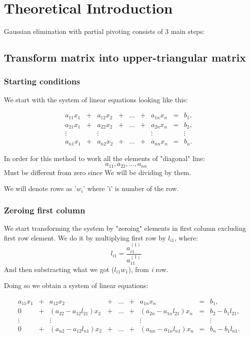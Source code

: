 \section{Theoretical Introduction}
Gaussian elimination with partial pivoting consists of 3 main steps:
\subsection{Transform matrix into upper-triangular matrix}

\subsubsection{Starting conditions}
We start with the system of linear equations looking like this:

\[
\begin{matrix}

&a_{11}x_1 &{}+&a_{12}x_2&+&\dots&+&a_{1n}x_n &=&b_1,\\

&a_{21}x_1 &{}+&a_{22}x_2&+&\dots&+&a_{2n}x_n &=&b_2,\\

&\vdots    &&\vdots      & &     & &  \vdots  & &\vdots\\

&a_{n1}x_1&{}+&a_{n2}x_2&+&\dots &+&a_{nn}x_n&=&b_n.

\end{matrix}
\]

In order for this method to work all the elements of "diagonal" line:
\[ a_{11}, a_{22}, \dots, a_{nn} \]
Must be different from zero since We will be dividing by them.

We will denote rows as '$w_i$' where 'i' is number of the row.

\subsubsection{Zeroing first column}
We start transforming the system by "zeroing" elements in first column excluding first row element. We do it by multiplying first row by $l_{i1}$, where:
\[ l_{i1} = \frac{ a_{i1}^{(1)} }
{ a_{11}^{(1)} }  \]
And then substracting what we got ($ l_{i1}w_1 $), from \textit{i} row.

Doing so we obtain a system of linear equations:

\[
\begin{matrix}

&a_{11}x_1 &{}+&a_{12}x_2&+&\dots&+&a_{1n}x_n &=&b_1,\\

&0 &{}+&(a_{22} - a_{12}l_{21})x_2&{}+&\dots&{}+&(a_{2n} - a_{1n}l_{21})x_n &=&b_2 - b_{1}l_{21},\\

&\vdots    &&\vdots      & &     & &  \vdots  & &\vdots\\

&0&{}+&(a_{n2} - a_{12}l_{n1})x_2&+&\dots &+&(a_{nn} - a_{1n}l_{n1})x_n&=&b_n - b_{1}l_{n1}.

\end{matrix}
\]

